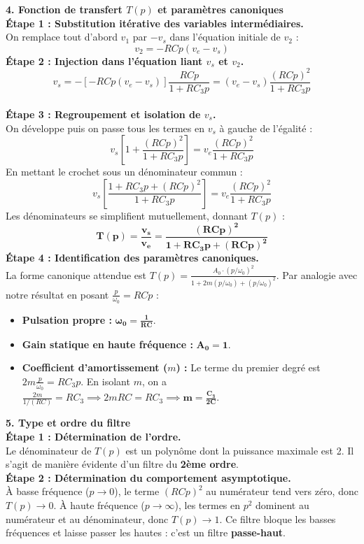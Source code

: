 \documentclass[11pt, a4paper]{article}
\begin{document}
{\vspace{0.2cm}
\textbf{4. Fonction de transfert $T(p)$ et paramètres canoniques}\\
\textbf{Étape 1 : Substitution itérative des variables intermédiaires.}\\
On remplace tout d'abord $v_1$ par $-v_s$ dans l'équation initiale de $v_2$ :
$$ v_2 = -RCp(v_e - v_s) $$
\textbf{Étape 2 : Injection dans l'équation liant $v_s$ et $v_2$.}\\
$$ v_s = - \left[ -RCp(v_e - v_s) \right] \frac{RCp}{1 + R C_3 p} = (v_e - v_s) \frac{(RCp)^2}{1 + R C_3 p} $$ \\
\textbf{Étape 3 : Regroupement et isolation de $v_s$.}\\
On développe puis on passe tous les termes en $v_s$ à gauche de l'égalité :
$$ v_s \left[ 1 + \frac{(RCp)^2}{1 + R C_3 p} \right] = v_e \frac{(RCp)^2}{1 + R C_3 p} $$
En mettant le crochet sous un dénominateur commun :
$$ v_s \left[ \frac{1 + R C_3 p + (RCp)^2}{1 + R C_3 p} \right] = v_e \frac{(RCp)^2}{1 + R C_3 p} $$
Les dénominateurs se simplifient mutuellement, donnant $T(p)$ :
$$ \mathbf{T(p) = \frac{v_s}{v_e} = \frac{(RCp)^2}{1 + R C_3 p + (RCp)^2}} $$
\textbf{Étape 4 : Identification des paramètres canoniques.}\\
La forme canonique attendue est $T(p) = \frac{A_0 \cdot (p/\omega_0)^2}{1 + 2m(p/\omega_0) + (p/\omega_0)^2}$. Par analogie avec notre résultat en posant $\frac{p}{\omega_0} = RCp$ :
\begin{itemize}
    \item \textbf{Pulsation propre :} $\mathbf{\omega_0 = \frac{1}{RC}}$.
    \item \textbf{Gain statique en haute fréquence :} $\mathbf{A_0 = 1}$.
    \item \textbf{Coefficient d'amortissement ($m$) :} Le terme du premier degré est $2m\frac{p}{\omega_0} = R C_3 p$. En isolant $m$, on a $\frac{2m}{1/(RC)} = R C_3 \implies 2m RC = R C_3 \implies \mathbf{m = \frac{C_3}{2C}}$.
\end{itemize}

\vspace{0.2cm}
\textbf{5. Type et ordre du filtre}\\
\textbf{Étape 1 : Détermination de l'ordre.}\\
Le dénominateur de $T(p)$ est un polynôme dont la puissance maximale est 2. Il s'agit de manière évidente d'un filtre du \textbf{2ème ordre}.\\
\textbf{Étape 2 : Détermination du comportement asymptotique.}\\
À basse fréquence ($p \to 0$), le terme $(RCp)^2$ au numérateur tend vers zéro, donc $T(p) \to 0$. À haute fréquence ($p \to \infty$), les termes en $p^2$ dominent au numérateur et au dénominateur, donc $T(p) \to 1$. Ce filtre bloque les basses fréquences et laisse passer les hautes : c'est un filtre \textbf{passe-haut}.

}
\end{document}
